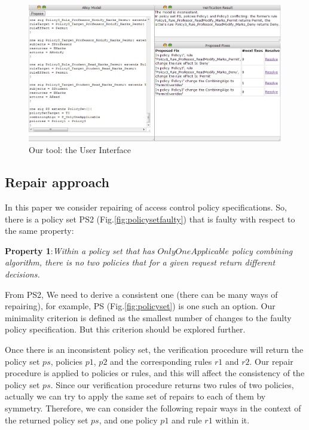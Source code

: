 \documentclass{acm_proc_article-sp}
\begin{document}
\begin{figure}[ht]
\includegraphics[width=\textwidth]{tool.png}
\caption{Our tool: the User Interface}    
  \label{fig:tool}
\end{figure}

\subsection{Repair approach}

In this paper we consider repairing of access control policy specifications. So, there is a policy set PS2 (Fig.\ref{fig:policysetfaulty}) that is faulty with respect to the same property:

\textbf{Property 1}:\textit{Within a policy set that has $OnlyOneApplicable$ policy combining algorithm, there is no two policies that for a given request return different decisions.}

From PS2, We need to derive a consistent one (there can be many ways of repairing), for example, PS (Fig.\ref{fig:policyset}) is one such an option. Our minimality criterion is defined as the smallest number of changes to the faulty policy specification. But this criterion should be explored further.

Once there is an inconsistent policy set, the verification procedure will return the policy set $ps$, policies $p1$, $p2$ and the corresponding rules $r1$ and $r2$. Our repair procedure is applied to policies or rules, and this will affect the consistency of the policy set $ps$. Since our verification procedure returns two rules of two policies, actually we can try to apply the same set of repairs to each of them by symmetry. Therefore, we can consider the following repair ways in the context of the returned policy set $ps$, and one policy $p1$ and rule $r1$ within it.
\end{document}

